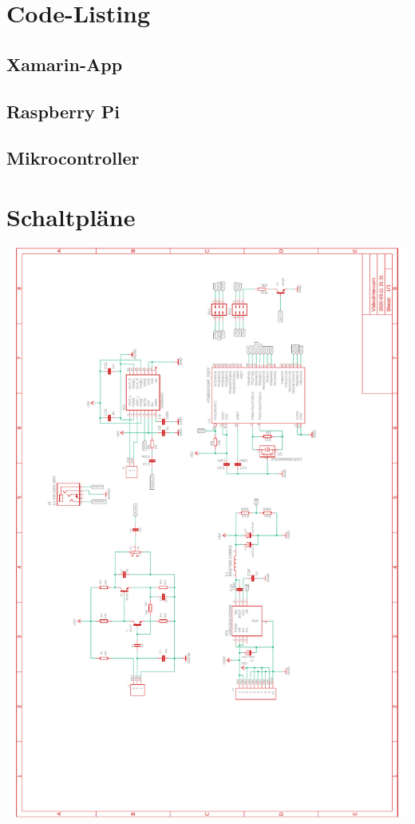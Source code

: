 \section{Code-Listing}
\subsection{Xamarin-App}

\subsection{Raspberry Pi}

\subsection{Mikrocontroller}


\section{Schaltpläne}
\includegraphics[width=15.5cm]{images/appendix/schematics.pdf}

